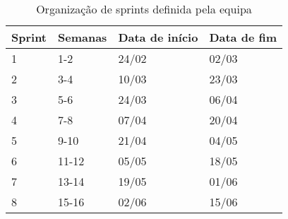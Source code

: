 \begin{table}[h!tbp]
    \centering
    \begin{tabular}{llll}
        Sprint & Semanas & Data de início & Data de fim \\\midrule
        1      & 1-2     & 24/02          & 02/03       \\\midrule
        2      & 3-4     & 10/03          & 23/03       \\\midrule
        3      & 5-6     & 24/03          & 06/04       \\\midrule
        4      & 7-8     & 07/04          & 20/04       \\\midrule
        5      & 9-10    & 21/04          & 04/05       \\\midrule
        6      & 11-12   & 05/05          & 18/05       \\\midrule
        7      & 13-14   & 19/05          & 01/06       \\\midrule
        8      & 15-16   & 02/06          & 15/06       \\\bottomrule
    \end{tabular}
    \caption{Organização de sprints definida pela equipa}
    \label{tab:organizacao_sprints}
\end{table}